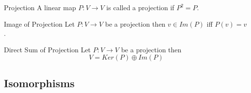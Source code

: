 \documentclass[11pt,a4paper]{article}
\begin{document}
\subtitle{Defintion 7.21 - }{Projection}
A linear map $P : V \to V$ is called a projection if $P^2 = P$.\\

\subtitle{Theorem 7.22 - }{Image of Projection}
Let $P : V \to V$ be a projection then $v \in Im(P)$ iff $P(v) = v$.\\

\subtitle{Theorem 7.22 - }{Direct Sum of Projection}
Let $P : V \to V$ be a projection then
$$V = Ker(P) \oplus Im(P)$$

\subsection{Isomorphisms}
\end{document}
